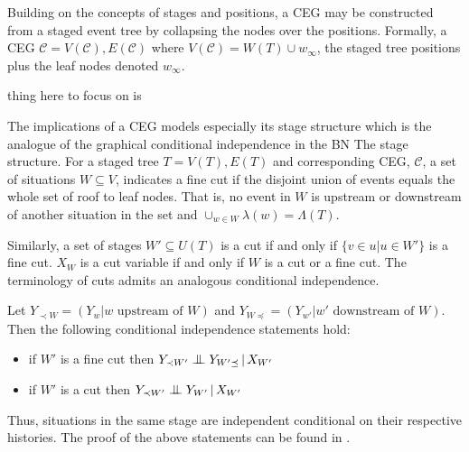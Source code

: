 \documentclass[12pt]{article}
\newcommand{\bigCI}{\mathrel{\text{\scalebox{1.07}{$\perp\mkern-10mu\perp$}}}}
\begin{document}
Building on the concepts of stages and positions, a CEG may be constructed from a staged event tree by collapsing the nodes over the positions. Formally, a CEG $\mathcal{C} = V(\mathcal{C}), E(\mathcal{C})$ where $V(\mathcal{C}) = W(T) \cup w_\infty$, the staged tree positions plus the leaf nodes denoted $w_\infty$. 

thing here to focus on is


The implications of a CEG models especially its stage structure which
is the analogue of the graphical conditional independence in the BN
\cite{Dawid 1979} \cite{Studen 2005} %
The stage structure. For a staged tree $T = V(T), E(T)$ and corresponding CEG, $\mathcal{C}$, a set of situations $W \subseteq V$, indicates a fine cut if the disjoint union of events equals the whole set of roof to leaf nodes. That is, no event in $W$ is upstream or downstream of another situation in the set and $\cup_{w \in W} \lambda(w) = \Lambda (T)$.

Similarly, a set of stages $W' \subseteq U(T)$ is a cut if and only if $\{ v \in u | u \in W'\} $ is a fine cut. $X_W$ is a cut variable if and only if  $W$ is a cut or a fine cut. The terminology of cuts admits an analogous conditional independence. 

Let $Y_{\prec W} = (Y_w | w \text{ upstream of } W)$ and $ Y_{W\preceq} = (Y_{w'}  | w' \text{ downstream of } W) $. Then the following conditional independence statements hold:  

\begin{itemize}
	\item if $W'$ is a fine cut then $Y_{\prec W'} \bigCI Y_{W'\preceq} \,|\, X_{W'}$ 
	\item if $W'$ is a cut then $Y_{\prec W'} \bigCI Y_{W'} \,|\, X_{W'}$ 
\end{itemize}

Thus, situations in the same stage are independent conditional on their respective histories. The proof of the above statements can be found in \cite{SmithAnderson} \cite{ThwaitesSmith}. %


  
\end{document}
